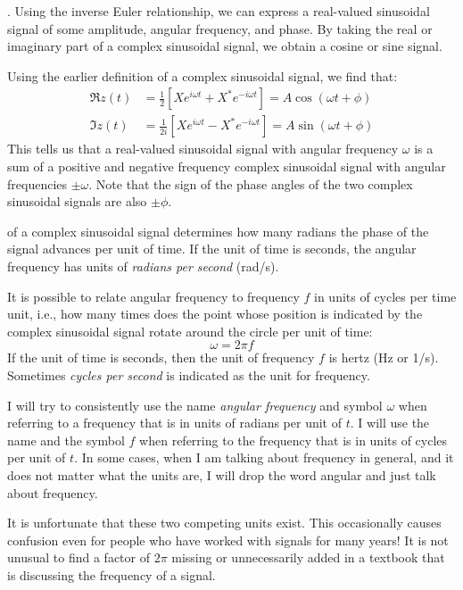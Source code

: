 .
Using the inverse Euler relationship, we can express a real-valued sinusoidal signal
of some amplitude, angular frequency, and phase. By taking the real or imaginary part
of a complex sinusoidal signal, we obtain a cosine or sine signal.

Using the earlier definition of a complex sinusoidal signal, we find that:
\begin{align}
  \Re{z(t)} & = \frac{1}{2}\left[X e^{i\omega t} + X^* e^{-i\omega t}\right] = A\cos(\omega t + \phi) \label{eq:resignal}  \\
  \Im{z(t)} & = \frac{1}{2i}\left[X e^{i\omega t} - X^* e^{-i\omega t}\right] = A\sin(\omega t + \phi) \label{eq:imsignal}
\end{align}
This tells us that a real-valued sinusoidal signal with angular frequency $\omega$
is a sum of a positive and negative frequency complex sinusoidal signal with angular
frequencies $\pm\omega$. Note that the sign of the phase angles of the two
complex sinusoidal signals are also $\pm\phi$.

 of a complex sinusoidal signal determines
how many radians the phase of the signal advances per unit of time. If the unit of
time is seconds, the angular frequency has units of \emph{radians per second} (rad/s).

It is possible to relate angular frequency to frequency $f$ in units of cycles per time
unit, i.e., how many times does the point whose position is indicated by the complex sinusoidal
signal rotate around the circle per unit of time:
\begin{equation}
  \boxed{\omega = 2\pi f}
\end{equation}
If the unit of time is seconds, then the unit of frequency $f$ is hertz (Hz or 1/s).
Sometimes \emph{cycles per second} is indicated as the unit for frequency.

I will try to consistently use the name \emph{angular frequency} and symbol $\omega$
when referring to a frequency that is in units of radians per unit of $t$.
I will use the name \emph{} and the symbol $f$ when referring
to the frequency that is in units of cycles
per unit of $t$. In some cases, when I am talking about frequency in general,
and it does not matter what the units are, I will drop the word angular and just talk about frequency.

It is unfortunate that these two competing units exist.
This occasionally causes confusion even for people who have worked with signals for many years!
It is not unusual to find a factor of $2\pi$ missing or unnecessarily
added in a textbook that is discussing the frequency of a signal.

